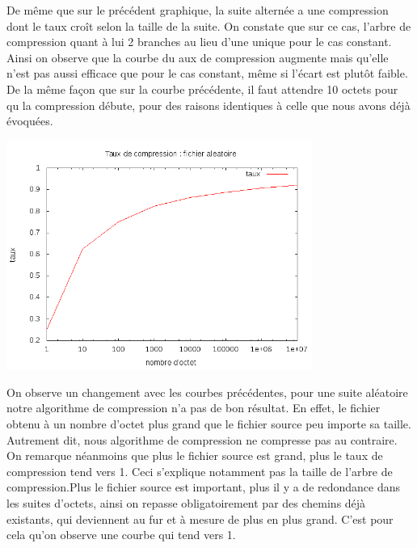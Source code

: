 \documentclass{report}
\begin{document}
De même que sur le précédent graphique, la suite alternée a une compression dont le taux croît selon la taille de la suite. On constate que sur ce cas, l'arbre de compression quant à lui 2 branches au lieu d'une unique pour le cas constant. Ainsi on observe que la courbe du aux de compression augmente mais qu'elle n'est pas aussi efficace que pour le cas constant, même si l'écart est plutôt faible.
De la même façon que sur la courbe précédente, il faut attendre 10 octets pour qu la compression débute, pour des raisons identiques à celle que nous avons déjà évoquées.  

\begin{center}
\includegraphics[width=10cm]{LZAleatoire.png}
\end{center}

On observe un changement avec les courbes précédentes, pour une suite aléatoire notre algorithme de compression n'a pas de bon résultat. En effet, le fichier obtenu à un nombre d'octet plus grand que le fichier source peu importe sa taille. Autrement dit, nous algorithme de compression ne compresse pas au contraire. 
On remarque néanmoins que plus le fichier source est grand, plus le taux de compression tend vers 1. Ceci s'explique notamment pas la taille de l'arbre de compression.Plus le fichier source est important, plus il y a de redondance dans les suites d'octets, ainsi on repasse obligatoirement par des chemins déjà existants, qui deviennent au fur et à mesure de plus en plus grand. 
C'est pour cela qu'on observe une courbe qui tend vers 1. 
\end{document}
